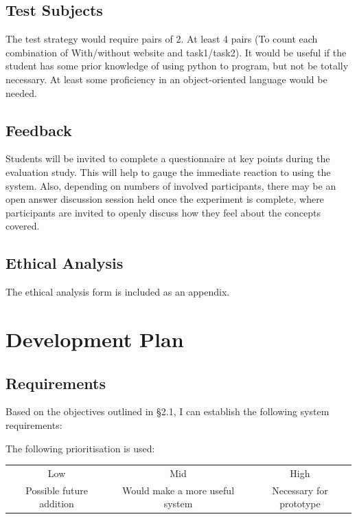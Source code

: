 \documentclass[a4paper,11pt]{report}
\begin{document}
\section{Test Subjects}
The test strategy would require pairs of 2. At least 4 pairs (To count each combination of With/without website and task1/task2). It would be useful if the student has some prior knowledge of using python to program, but not be totally necessary. At least some proficiency in an object-oriented language would be needed.

\section{Feedback}
Students will be invited to complete a questionnaire at key points during the evaluation study. This will help to gauge the immediate reaction to using the system. Also, depending on numbers of involved participants, there may be an open answer discussion session held once the experiment is complete, where participants are invited to openly discuss how they feel about the concepts covered.

\section{Ethical Analysis}
The ethical analysis form is included as an appendix.



\chapter{Development Plan}

\section{Requirements}
Based on the objectives outlined in \S 2.1, I can establish the following system requirements:\par
The following prioritisation is used:\\
\begin{tabular}{ccc}
 Low & Mid & High\\
 Possible future addition & Would make a more useful system & Necessary for prototype
\end{tabular}
\end{document}
